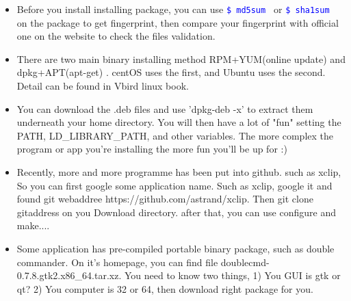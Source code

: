 \documentclass[a4paper,12pt,twoside]{book}
\newcommand{\linuxcommand}[1]{\texttt{\textcolor{blue}{\$ #1 \Pisymbol{psy}{191}}}}
\begin{document}
\begin{itemize}
	\item Before you install installing package, you can use \linuxcommand{md5sum} or \linuxcommand{sha1sum} on the package to get fingerprint, then compare your fingerprint with official one on the website to check the files validation.  
    \item There are two main binary installing method RPM+YUM(online update) and dpkg+APT(apt-get) . centOS uses the first, and Ubuntu uses the second. Detail can be found in Vbird linux book.

	\item  You can download the .deb files and use 'dpkg-deb -x' to extract them underneath your home directory. You will then have a lot of "fun" setting the PATH, LD\_LIBRARY\_PATH, and other variables. The more complex the program or app you're installing the more fun you'll be up for :)

	\item Recently, more and more programme has been put into github. such as xclip, So you can first google some application name. Such as xclip, google it and found git webaddree https://github.com/astrand/xclip. Then git clone gitaddress on you Download directory. after that, you can use configure and make....

	\item Some application has pre-compiled portable binary package, such as double commander. On it's homepage, you can find file  doublecmd-0.7.8.gtk2.x86\_64.tar.xz. You need to know two things, 1) You GUI is gtk or qt? 2) You computer is 32 or 64, then download right package for you.
	\end{itemize}
\end{document}
